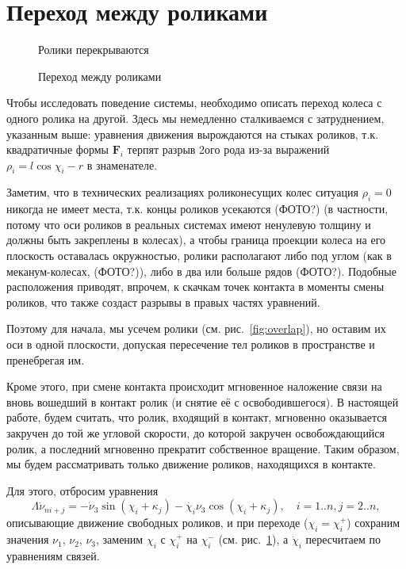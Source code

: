 \section{Переход между роликами}

\begin{figure}
        \centering
        \caption{Ролики перекрываются}
        \label{fig:overlap}
    \endminipage
        \centering
        \caption{Переход между роликами}
        \label{fig:change}
    \endminipage
\end{figure}

Чтобы исследовать поведение системы, необходимо описать переход колеса с одного ролика на другой. Здесь мы немедленно сталкиваемся с затруднением, указанным выше: уравнения движения вырождаются на стыках роликов, т.к. квадратичные формы $\boldsymbol{F}_i$ терпят разрыв 2ого рода из-за выражений $\rho_i = l\cos\chi_i-r$ в знаменателе.

Заметим, что в технических реализациях роликонесущих колес ситуация $\rho_i = 0$ никогда не имеет места, т.к. концы роликов усекаются (ФОТО?) (в частности, потому что оси роликов в реальных системах имеют ненулевую толщину и должны быть закреплены в колесах), а чтобы граница проекции колеса на его плоскость оставалась окружностью, ролики располагают либо под углом (как в меканум-колесах, (ФОТО?)), либо в два или больше рядов (ФОТО?). Подобные расположения приводят, впрочем, к скачкам точек контакта в моменты смены роликов, что также создаст разрывы в правых частях уравнений.

Поэтому для начала, мы усечем ролики (см. рис.~\ref{fig:overlap}), но оставим их оси в одной плоскости, допуская пересечение тел роликов в пространстве и пренебрегая им.

Кроме этого, при смене контакта происходит мгновенное наложение связи на вновь вошедший в контакт ролик (и снятие её с освободившегося). В настоящей работе, будем считать, что ролик, входящий в контакт, мгновенно оказывается закручен до той же угловой скорости, до которой закручен освобождающийся ролик, а последний мгновенно прекратит собственное вращение. Таким образом, мы будем рассматривать только движение роликов, находящихся в контакте.

Для этого, отбросим уравнения
$$
\Lambda\dot{\nu}_{ni+j} = -\dot{\nu}_3\sin(\chi_i+\kappa_j) - \dot{\chi_i}\nu_3\cos(\chi_i+\kappa_j), \quad i = 1..n, j = 2..n,
$$
описывающие движение свободных роликов, и при переходе ($\chi_i = \chi_i^+$) сохраним значения $\nu_1$, $\nu_2$, 
$\nu_3$, заменим $\chi_i$ с $\chi_i^+$ на $\chi_i^-$ (см. рис.~\ref{fig:change}), а $\dot\chi_i$ пересчитаем по уравнениям связей.
